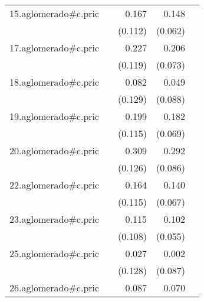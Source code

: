 {\begin{longtable}{l*{4}{D{.}{.}{-1}}}
\addlinespace
15.aglomerado#c.pric&                     &       0.167         &       0.148\sym{*}  &                     \\
            &                     &     (0.112)         &     (0.062)         &                     \\
\addlinespace
17.aglomerado#c.pric&                     &       0.227         &       0.206\sym{**} &                     \\
            &                     &     (0.119)         &     (0.073)         &                     \\
\addlinespace
18.aglomerado#c.pric&                     &       0.082         &       0.049         &                     \\
            &                     &     (0.129)         &     (0.088)         &                     \\
\addlinespace
19.aglomerado#c.pric&                     &       0.199         &       0.182\sym{**} &                     \\
            &                     &     (0.115)         &     (0.069)         &                     \\
\addlinespace
20.aglomerado#c.pric&                     &       0.309\sym{*}  &       0.292\sym{***}&                     \\
            &                     &     (0.126)         &     (0.086)         &                     \\
\addlinespace
22.aglomerado#c.pric&                     &       0.164         &       0.140\sym{*}  &                     \\
            &                     &     (0.115)         &     (0.067)         &                     \\
\addlinespace
23.aglomerado#c.pric&                     &       0.115         &       0.102         &                     \\
            &                     &     (0.108)         &     (0.055)         &                     \\
\addlinespace
25.aglomerado#c.pric&                     &       0.027         &       0.002         &                     \\
            &                     &     (0.128)         &     (0.087)         &                     \\
\addlinespace
26.aglomerado#c.pric&                     &       0.087         &       0.070         &                     \\

\end{longtable}}
